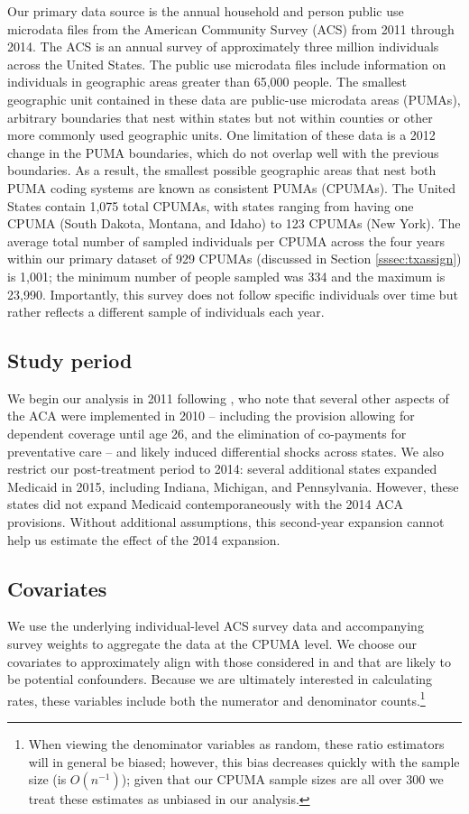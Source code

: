 \documentclass[12pt]{article}
\begin{document}
Our primary data source is the annual household and person public use microdata files from the American Community Survey (ACS) from 2011 through 2014. The ACS is an annual survey of approximately three million individuals across the United States. The public use microdata files include information on individuals in geographic areas greater than 65,000 people. The smallest geographic unit contained in these data are public-use microdata areas (PUMAs), arbitrary boundaries that nest within states but not within counties or other more commonly used geographic units. One limitation of these data is a 2012 change in the PUMA boundaries, which do not overlap well with the previous boundaries. As a result, the smallest possible geographic areas that nest both PUMA coding systems are known as consistent PUMAs (CPUMAs). The United States contain 1,075 total CPUMAs, with states ranging from having one CPUMA (South Dakota, Montana, and Idaho) to 123 CPUMAs (New York). The average total number of sampled individuals per CPUMA across the four years within our primary dataset of 929 CPUMAs (discussed in Section \ref{sssec:txassign}) is 1,001; the minimum number of people sampled was 334 and the maximum is 23,990. Importantly, this survey does not follow specific individuals over time but rather reflects a different sample of individuals each year.

\subsection{Study period}

We begin our analysis in 2011 following \cite{courtemanche2017early}, who note that several other aspects of the ACA were implemented in 2010 -- including the provision allowing for dependent coverage until age 26, and the elimination of co-payments for preventative care -- and likely induced differential shocks across states. We also restrict our post-treatment period to 2014: several additional states expanded Medicaid in 2015, including Indiana, Michigan, and Pennsylvania. However, these states did not expand Medicaid contemporaneously with the 2014 ACA provisions. Without additional assumptions, this second-year expansion cannot help us estimate the effect of the 2014 expansion. 

\subsection{Covariates}

We use the underlying individual-level ACS survey data and accompanying survey weights to aggregate the data at the CPUMA level. We choose our covariates to approximately align with those considered in \cite{courtemanche2017early} and that are likely to be potential confounders. Because we are ultimately interested in calculating rates, these variables include both the numerator and denominator counts.\footnote{When viewing the denominator variables as random, these ratio estimators will in general be biased; however, this bias decreases quickly with the sample size (is $O(n^{-1})$); given that our CPUMA sample sizes are all over 300 we treat these estimates as unbiased in our analysis.}
\end{document}
